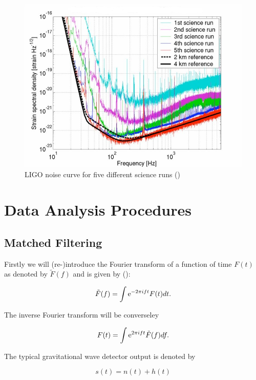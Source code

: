 \documentclass[epsf]{article}
\begin{document}
\begin{figure}[ht]
\centering
\includegraphics[scale=0.30]{ligonoise.jpg}
\caption{LIGO noise curve for five different science runs (\cite{abbott2006,abbott2007,ligoweb,ian})}
\label{fig:ligonoise}
\end{figure}


\section{Data Analysis Procedures}

\subsection{Matched Filtering}

Firstly we will (re-)introduce the Fourier transform of a function of time $F(t)$ as denoted by
$\tilde F (f)$ and is given by (\cite{allen,maggiore,cre}):

\begin{equation}
{\tilde F}(f) = \int {\rm e}^{- 2 \pi i f t} F(t) dt.
\end{equation}

The inverse Fourier transform will be converseley

\begin{equation}
F(t)= \int {\rm e}^{2 \pi i f t} {\tilde F}(f) df.
\end{equation}

The typical gravitational wave detector output is denoted by

\begin{equation}
s(t) = n(t) + h(t)
\end{equation}
\end{document}
